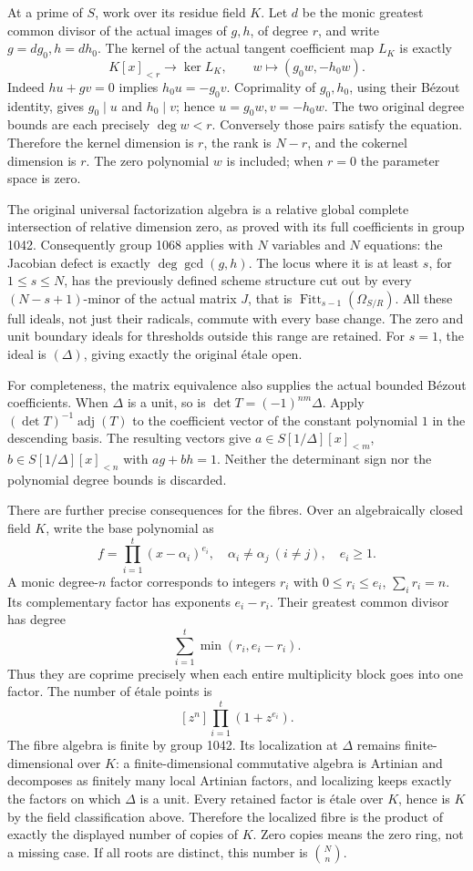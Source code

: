 At a prime of \(S\), work over its residue field \(K\). Let \(d\) be the monic greatest common divisor of the actual images of \(g,h\), of degree \(r\), and write \(g=dg_0,h=dh_0\). The kernel of the actual tangent coefficient map \(L_K\) is exactly \[
K[x]_{<r}\longrightarrow\ker L_K,\qquad
w\longmapsto(g_0w,-h_0w).
\] Indeed \(hu+gv=0\) implies \(h_0u=-g_0v\). Coprimality of \(g_0,h_0\), using their Bézout identity, gives \(g_0\mid u\) and \(h_0\mid v\); hence \(u=g_0w,v=-h_0w\). The two original degree bounds are each precisely \(\deg w<r\). Conversely those pairs satisfy the equation. Therefore the kernel dimension is \(r\), the rank is \(N-r\), and the cokernel dimension is \(r\). The zero polynomial \(w\) is included; when \(r=0\) the parameter space is zero.

The original universal factorization algebra is a relative global complete intersection of relative dimension zero, as proved with its full coefficients in group 1042. Consequently group 1068 applies with \(N\) variables and \(N\) equations: the Jacobian defect is exactly \(\deg\gcd(g,h)\). The locus where it is at least \(s\), for \(1\le s\le N\), has the previously defined scheme structure cut out by every \((N-s+1)\)-minor of the actual matrix \(J\), that is \(\operatorname{Fitt}_{s-1}(\Omega_{S/R})\). All these full ideals, not just their radicals, commute with every base change. The zero and unit boundary ideals for thresholds outside this range are retained. For \(s=1\), the ideal is \((\Delta)\), giving exactly the original étale open.

For completeness, the matrix equivalence also supplies the actual bounded Bézout coefficients. When \(\Delta\) is a unit, so is \(\det T=(-1)^{nm}\Delta\). Apply \((\det T)^{-1}\operatorname{adj}(T)\) to the coefficient vector of the constant polynomial \(1\) in the descending basis. The resulting vectors give \(a\in S[1/\Delta][x]_{<m}\), \(b\in S[1/\Delta][x]_{<n}\) with \(ag+bh=1\). Neither the determinant sign nor the polynomial degree bounds is discarded.

There are further precise consequences for the fibres. Over an algebraically closed field \(K\), write the base polynomial as \[
f=\prod_{i=1}^t(x-\alpha_i)^{e_i},
\quad \alpha_i\ne\alpha_j\ (i\ne j),\quad e_i\ge1.
\] A monic degree-\(n\) factor corresponds to integers \(r_i\) with \(0\le r_i\le e_i\), \(\sum_i r_i=n\). Its complementary factor has exponents \(e_i-r_i\). Their greatest common divisor has degree \[
\sum_{i=1}^t\min(r_i,e_i-r_i).
\] Thus they are coprime precisely when each entire multiplicity block goes into one factor. The number of étale points is \[
[z^n]\prod_{i=1}^t(1+z^{e_i}).
\] The fibre algebra is finite by group 1042. Its localization at \(\Delta\) remains finite-dimensional over \(K\): a finite-dimensional commutative algebra is Artinian and decomposes as finitely many local Artinian factors, and localizing keeps exactly the factors on which \(\Delta\) is a unit. Every retained factor is étale over \(K\), hence is \(K\) by the field classification above. Therefore the localized fibre is the product of exactly the displayed number of copies of \(K\). Zero copies means the zero ring, not a missing case. If all roots are distinct, this number is \(\binom{N}{n}\).

